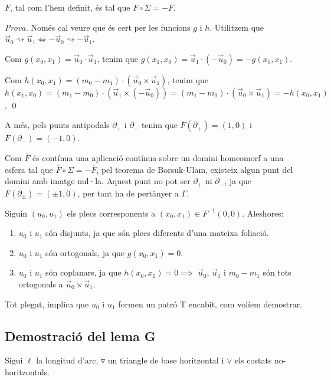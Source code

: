 \begin{prop}
    $F$, tal com l'hem definit, és tal que $F\circ\Sigma = -F$.
\end{prop}
{
    \color{green!50!black}
    \textit{Prova.}
    Només cal veure que és cert per les funcions $g$ i $h$. Utilitzem que $\vec u_0\rightsquigarrow\vec u_1\iff-\vec u_0\rightsquigarrow-\vec u_1$.

    Com $g(x_0,x_1) = \vec u_0\cdot\vec u_1$, tenim que $g(x_1,x_0) = \vec u_1 \cdot (-\vec u_0) = -g(x_0,x_1)$.

    Com $h(x_0,x_1) = (m_0- m_1)\cdot(\vec u_0\times\vec u_1)$, tenim que $h(x_1,x_0) = (m_1- m_0)\cdot(\vec u_1\times(-\vec u_0)) = (m_1- m_0)\cdot(\vec u_0\times\vec u_1) = -h(x_0,x_1)$.
    \qed
}

A més, pels punts antipodals $\partial_+$ i $\partial_-$ tenim que $\overline{F}(\partial_+) = (1,0)$ i $\overline{F}(\partial_-) = (-1,0)$.

Com $\overline{F}$ és contínua una aplicació contínua sobre un domini homeomorf a una esfera tal que $\overline{F}\circ\Sigma = -\overline{F}$, pel teorema de Borsuk-Ulam, existeix algun punt del domini amb imatge nul·la. Aquest punt no pot ser $\partial_+$ ni $\partial_-$, ja que $\overline{F}(\partial_\pm) = (\pm1,0)$, per tant ha de pertànyer a $\Gamma$.

Siguin $(u_0,u_1)$ els plecs corresponents a $(x_0,x_1)\in F^{-1}(0,0)$.
Aleshores:
\begin{enumerate}
    \item $u_0$ i $u_1$ són disjunts, ja que són plecs diferents d'una mateixa foliació.
    \item $u_0$ i $u_1$ són ortogonals, ja que $g(x_0,x_1) = 0$.
    \item $u_0$ i $u_1$ són coplanars, ja que $h(x_0,x_1) = 0\implies$ $\vec u_0$, $\vec u_1$ i $m_0-m_1$ són tots ortogonals a $\vec u_0\times\vec u_1$.
\end{enumerate}

Tot plegat, implica que $u_0$ i $u_1$ formen un patró T encabit, com volíem demostrar.

\subsection{Demostració del lema G}
\begin{nota}
    Sigui $\ell$ la longitud d'arc, $\triangledown$ un triangle de base horitzontal i $\lor$ els costats no-horitzontals.
\end{nota}

